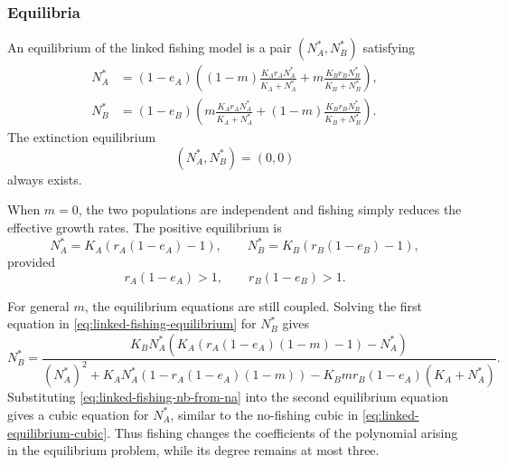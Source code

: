 \documentclass{article}
\numberwithin{equation}{section}
\begin{document}
\subsubsection{Equilibria}
An equilibrium of the linked fishing model is a pair
$(N_A^*,N_B^*)$ satisfying
\begin{equation}
    \label{eq:linked-fishing-equilibrium}
    \begin{aligned}
        N_A^*
            &= (1-e_A)
            \left(
                (1-m)\frac{K_A r_A N_A^*}{K_A+N_A^*}
                +m\frac{K_B r_B N_B^*}{K_B+N_B^*}
            \right),\\
        N_B^*
            &= (1-e_B)
            \left(
                m\frac{K_A r_A N_A^*}{K_A+N_A^*}
                +(1-m)\frac{K_B r_B N_B^*}{K_B+N_B^*}
            \right).
    \end{aligned}
\end{equation}
The extinction equilibrium
\begin{equation*}
    (N_A^*,N_B^*)=(0,0)
\end{equation*}
always exists.

When $m=0$, the two populations are independent and fishing simply
reduces the effective growth rates. The positive equilibrium is
\begin{equation*}
    N_A^*=K_A(r_A(1-e_A)-1),
    \qquad
    N_B^*=K_B(r_B(1-e_B)-1),
\end{equation*}
provided
\begin{equation*}
    r_A(1-e_A)>1,
    \qquad
    r_B(1-e_B)>1.
\end{equation*}

For general $m$, the equilibrium equations are still coupled. Solving
the first equation in \eqref{eq:linked-fishing-equilibrium} for
$N_B^*$ gives
\begin{equation}
    \label{eq:linked-fishing-nb-from-na}
    N_B^*
    =
    \frac{
        K_BN_A^*
        \left(K_A(r_A(1-e_A)(1-m)-1)-N_A^*\right)
    }{
        (N_A^*)^2
        +K_AN_A^*\left(1-r_A(1-e_A)(1-m)\right)
        -K_Bmr_B(1-e_A)(K_A+N_A^*)
    }.
\end{equation}
Substituting \eqref{eq:linked-fishing-nb-from-na} into the second
equilibrium equation gives a cubic equation for $N_A^*$, similar to the
no-fishing cubic in \eqref{eq:linked-equilibrium-cubic}. Thus fishing
changes the coefficients of the polynomial arising in the equilibrium
problem, while its degree remains at most three.
\end{document}
